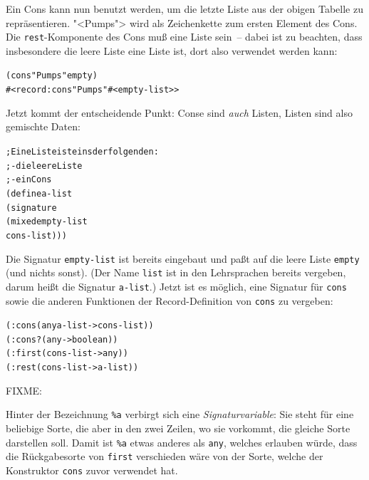 Ein Cons kann nun benutzt werden, um die letzte Liste aus der obigen
Tabelle zu repräsentieren.  "<Pumps"> wird als Zeichenkette zum ersten
Element des Cons.  Die \texttt{rest}-Komponente des Cons muß eine
Liste sein~-- dabei ist zu beachten, dass insbesondere die leere Liste
eine Liste ist, dort also verwendet werden kann:
%
\begin{alltt}
(cons "Pumps" empty)
\evalsto{} #<record:cons "Pumps" #<empty-list>>
\end{alltt}
%
Jetzt kommt der entscheidende Punkt: Conse sind \emph{auch} Listen,
Listen sind also gemischte Daten:\label{def:a-list}
%
\begin{alltt}
; Eine Liste ist eins der folgenden:
; - die leere Liste
; - ein Cons
(define a-list
  (signature
   (mixed empty-list
          cons-list)))
\end{alltt}
%
Die Signatur \texttt{empty-list} ist bereits eingebaut und paßt auf
die leere Liste \texttt{empty} (und nichts sonst).  (Der Name
\texttt{list} ist in den Lehrsprachen bereits vergeben, darum
heißt die Signatur \texttt{a-list}.)  Jetzt ist es möglich, eine
Signatur für \texttt{cons} sowie die anderen Funktionen der
Record-Definition von \texttt{cons} zu vergeben:
%
\begin{alltt}
(: cons (any a-list -> cons-list))
(: cons? (any -> boolean))
(: first (cons-list -> any))
(: rest (cons-list -> a-list))
\end{alltt}
%
FIXME:

Hinter der Bezeichnung \verb$%a$ verbirgt sich eine 
\emph{Signaturvariable}: Sie
steht für eine beliebige Sorte, die aber in den zwei Zeilen, wo sie vorkommt,
die gleiche Sorte darstellen soll.  Damit ist \verb$%a$ etwas anderes als
\texttt{any}, welches erlauben würde, dass die Rückgabesorte von \texttt{first}
verschieden wäre von der Sorte, welche der Konstruktor \texttt{cons} zuvor
verwendet hat.

